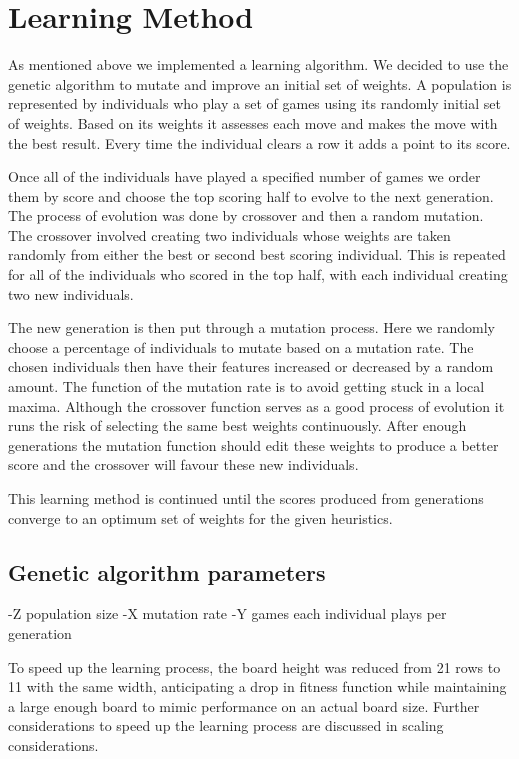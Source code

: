 \documentclass[10pt,a4paper]{report}
\begin{document}
\cite{leeyiyuan2013tetris}
\cite{lindstedt2013extreme}

\section{Learning Method}
As mentioned above we implemented a learning algorithm. We decided to use the genetic algorithm to mutate and improve an initial set of weights. A population is represented by individuals who play a set of games using its randomly initial set of weights. Based on its weights it assesses each move and makes the move with the best result. Every time the individual clears a row it adds a point to its score. 

Once all of the individuals have played a specified number of games we order them by score and choose the top scoring half to evolve to the next generation. The process of evolution was done by crossover and then a random mutation. The crossover involved creating two individuals whose weights are taken randomly from either the best or second best scoring individual. This is repeated for all of the individuals who scored in the top half, with each individual creating two new individuals. 

The new generation is then put through a mutation process. Here we randomly choose a percentage of individuals to mutate based on a mutation rate. The chosen individuals then have their features increased or decreased by a random amount. The function of the mutation rate is to avoid getting stuck in a local maxima. Although the crossover function serves as a good process of evolution it runs the risk of selecting the same best weights continuously. After enough generations the mutation function should edit these weights to produce a better score and the crossover will favour these new individuals.

This learning method is continued until the scores produced from generations converge to an optimum set of weights for the given heuristics.

\subsection{Genetic algorithm parameters}
-Z population size
-X mutation rate
-Y games each individual plays per generation

To speed up the learning process, the board height was reduced from 21 rows to 11 with the same width, anticipating a drop in fitness function while maintaining a large enough board to mimic performance on an actual board size. Further considerations to speed up the learning process are discussed in scaling considerations.
\end{document}
